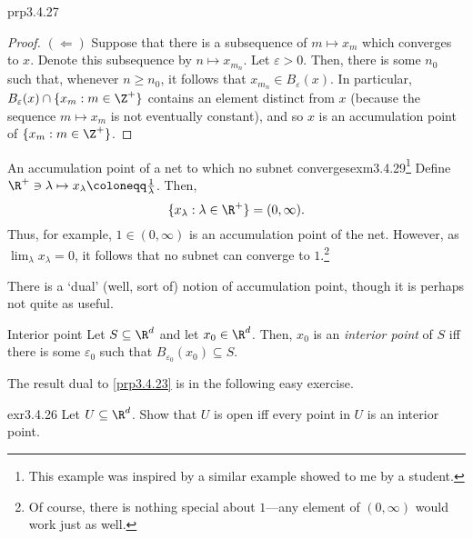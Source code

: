 \begin{prp}{}{prp3.4.27}
\begin{proof}
\blankline
\noindent
$(\Leftarrow )$ Suppose that there is a subsequence of $m\mapsto x_m$ which converges to $x$.  Denote this subsequence by $n\mapsto x_{m_n}$.  Let $\varepsilon >0$.  Then, there is some $n_0$ such that, whenever $n\geq n_0$, it follows that $x_{m_n}\in B_\varepsilon (x)$.  In particular, $B_\varepsilon (x)\cap \{ x_m:m\in \Z ^+\}$ contains an element distinct from $x$ (because the sequence $m\mapsto x_m$ is not eventually constant), and so $x$ is an accumulation point of $\{ x_m:m\in \Z ^+\}$.
\end{proof}
\end{prp}
\begin{exm}{An accumulation point of a net to which no subnet converges}{exm3.4.29}\footnote{This example was inspired by a similar example showed to me by a student.}
Define $\R ^+\ni \lambda \mapsto x_\lambda \coloneqq \frac{1}{\lambda}$.  Then,
\begin{equation}
\{ x_\lambda :\lambda \in \R ^+\} =(0,\infty ).
\end{equation}
Thus, for example, $1\in (0,\infty )$ is an accumulation point of the net.  However, as $\lim _\lambda x_\lambda =0$, it follows that no subnet can converge to $1$.\footnote{Of course, there is nothing special about $1$---any element of $(0,\infty )$ would work just as well.}
\end{exm}

There is a `dual' (well, sort of) notion of accumulation point, though it is perhaps not quite as useful.
\begin{dfn}{Interior point}{}
Let $S\subseteq \R ^d$ and let $x_0\in \R ^d$.  Then, $x_0$ is an \emph{interior point} of $S$ iff there is some $\varepsilon _0$ such that $B_{\varepsilon _0}(x_0)\subseteq S$.
\end{dfn}
The result dual to \cref{prp3.4.23} is in the following easy exercise.
\begin{exr}{}{exr3.4.26}
Let $U\subseteq \R ^d$.  Show that $U$ is open iff every point in $U$ is an interior point.
\end{exr}

